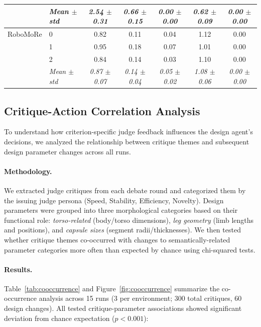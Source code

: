 \begin{table}[htbp]
\begin{tabular}{@{}llccccc@{}}
 & \textit{Mean $\pm$ std} & \textit{2.54 $\pm$ 0.31} & \textit{0.66 $\pm$ 0.15} & \textit{0.00 $\pm$ 0.00} & \textit{0.62 $\pm$ 0.09} & \textit{0.00 $\pm$ 0.00} \\
\midrule
RoboMoRe & 0 & 0.82 & 0.11 & 0.04 & 1.12 & 0.00 \\
 & 1 & 0.95 & 0.18 & 0.07 & 1.01 & 0.00 \\
 & 2 & 0.84 & 0.14 & 0.03 & 1.10 & 0.00 \\
 & \textit{Mean $\pm$ std} & \textit{0.87 $\pm$ 0.07} & \textit{0.14 $\pm$ 0.04} & \textit{0.05 $\pm$ 0.02} & \textit{1.08 $\pm$ 0.06} & \textit{0.00 $\pm$ 0.00} \\
\bottomrule
\end{tabular}
\end{table}

\subsection{Critique-Action Correlation Analysis}
\label{app:critique-analysis}

To understand how criterion-specific judge feedback influences the design agent's decisions, we analyzed the relationship between critique themes and subsequent design parameter changes across all \abbrev{} runs.

\paragraph{Methodology.}
We extracted judge critiques from each debate round and categorized them by the issuing judge persona (Speed, Stability, Efficiency, Novelty). Design parameters were grouped into three morphological categories based on their functional role: \emph{torso-related} (body/torso dimensions), \emph{leg geometry} (limb lengths and positions), and \emph{capsule sizes} (segment radii/thicknesses). We then tested whether critique themes co-occurred with changes to semantically-related parameter categories more often than expected by chance using chi-squared tests.

\paragraph{Results.}
Table~\ref{tab:cooccurrence} and Figure~\ref{fig:cooccurrence} summarize the co-occurrence analysis across 15 \abbrev{} runs (3 per environment; 300 total critiques, 60 design changes). All tested critique-parameter associations showed significant deviation from chance expectation ($p < 0.001$):

